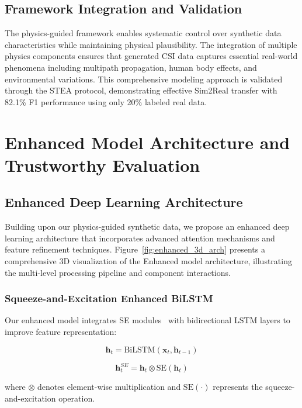 \documentclass[journal]{IEEEtran}
\begin{document}
\subsection{Framework Integration and Validation}

The physics-guided framework enables systematic control over synthetic data characteristics while maintaining physical plausibility. The integration of multiple physics components ensures that generated CSI data captures essential real-world phenomena including multipath propagation, human body effects, and environmental variations. This comprehensive modeling approach is validated through the STEA protocol, demonstrating effective Sim2Real transfer with 82.1\% F1 performance using only 20\% labeled real data.

\section{Enhanced Model Architecture and Trustworthy Evaluation}

\subsection{Enhanced Deep Learning Architecture}

Building upon our physics-guided synthetic data, we propose an enhanced deep learning architecture that incorporates advanced attention mechanisms and feature refinement techniques. Figure~\ref{fig:enhanced_3d_arch} presents a comprehensive 3D visualization of the Enhanced model architecture, illustrating the multi-level processing pipeline and component interactions.

\subsubsection{Squeeze-and-Excitation Enhanced BiLSTM}

Our enhanced model integrates SE modules~\cite{se_networks2018} with bidirectional LSTM layers to improve feature representation:

\begin{equation}
\mathbf{h}_t = \text{BiLSTM}(\mathbf{x}_t, \mathbf{h}_{t-1})
\end{equation}

\begin{equation}
\mathbf{h}_t^{SE} = \mathbf{h}_t \otimes \text{SE}(\mathbf{h}_t)
\end{equation}

where $\otimes$ denotes element-wise multiplication and $\text{SE}(\cdot)$ represents the squeeze-and-excitation operation.
\end{document}
